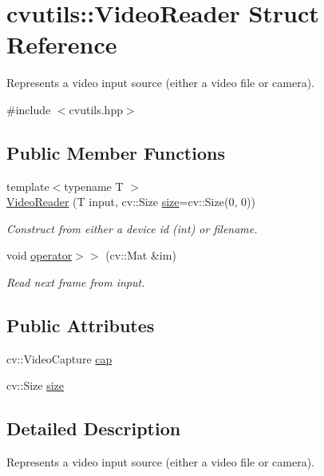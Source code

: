 \hypertarget{structcvutils_1_1_video_reader}{\section{cvutils\-:\-:Video\-Reader Struct Reference}
\label{structcvutils_1_1_video_reader}
}


Represents a video input source (either a video file or camera).  




{\ttfamily \#include $<$cvutils.\-hpp$>$}

\subsection*{Public Member Functions}
\begin{DoxyCompactItemize}
\item 
{\footnotesize template$<$typename T $>$ }\\\hyperlink{structcvutils_1_1_video_reader_a5d5f4f366698b131e3c80ac200cafbac}{Video\-Reader} (T input, cv\-::\-Size \hyperlink{structcvutils_1_1_video_reader_ac26957b49d881cb0dc896f076f4892a5}{size}=cv\-::\-Size(0, 0))
\begin{DoxyCompactList}\small\item\em Construct from either a device id (int) or filename. \end{DoxyCompactList}\item 
void \hyperlink{structcvutils_1_1_video_reader_aeefc2060b91297a48c465324eb1ad628}{operator$>$$>$} (cv\-::\-Mat \&im)
\begin{DoxyCompactList}\small\item\em Read next frame from input. \end{DoxyCompactList}\end{DoxyCompactItemize}
\subsection*{Public Attributes}
\begin{DoxyCompactItemize}
\item 
cv\-::\-Video\-Capture \hyperlink{structcvutils_1_1_video_reader_ae6b07273677636bf2144734c761153a6}{cap}
\item 
cv\-::\-Size \hyperlink{structcvutils_1_1_video_reader_ac26957b49d881cb0dc896f076f4892a5}{size}
\end{DoxyCompactItemize}


\subsection{Detailed Description}
Represents a video input source (either a video file or camera). 



